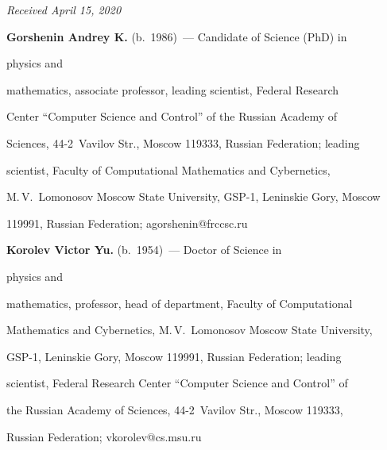 \vspace*{-9pt}





\hfill{\small\textit{Received April 15, 2020}}





















\Contr





\noindent


\textbf{Gorshenin Andrey K.} (b.\ 1986)~--- Candidate of Science (PhD) in 


physics and


mathematics, associate professor, leading scientist, Federal Research 


Center ``Computer Science and Control'' of the Russian Academy of 


Sciences, 44-2~Vavilov Str., Moscow 119333, Russian Federation; leading 


scientist, Faculty of Computational Mathematics and Cybernetics, 


M.\,V.~Lomonosov Moscow State University, GSP-1, Leninskie Gory, Moscow 


119991, Russian Federation; \mbox{agorshenin@frccsc.ru}





\vspace*{3pt}





\noindent


\textbf{Korolev Victor Yu.} (b.\ 1954)~--- Doctor of Science in 


physics and


mathematics, professor, head of department, Faculty of Computational 


Mathematics and Cybernetics, M.\,V.~Lomonosov Moscow State University, 


GSP-1, Leninskie Gory, Moscow 119991, Russian Federation; leading 


scientist, Federal Research Center ``Computer Science and Control'' of 


the Russian Academy of Sciences, 44-2~Vavilov Str., Moscow 119333, 


Russian Federation; \mbox{vkorolev@cs.msu.ru}








\label{end\stat}





\renewcommand{\bibname}{\protect\rm Литература} 


